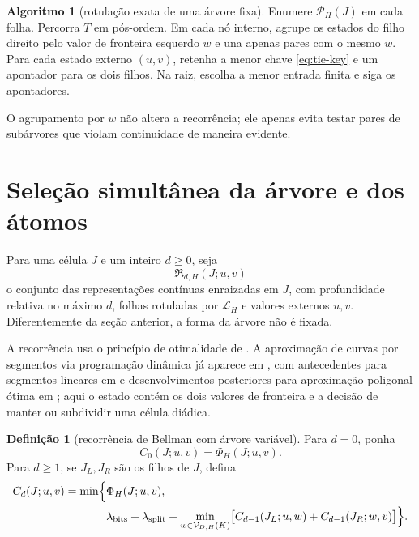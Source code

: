 \documentclass[11pt,a4paper]{article}
\theoremstyle{definition}
\newtheorem{definition}[theorem]{Definição}
\newtheorem{algorithm}[theorem]{Algoritmo}
\theoremstyle{remark}
\newcommand{\Library}{\mathcal{L}}
\newcommand{\Representations}{\mathfrak{R}}
\newcommand{\Values}{\mathcal{V}}
\newcommand{\Pairs}{\mathcal{P}}
\begin{document}
\begin{algorithm}[rotulação exata de uma árvore fixa]
\label{alg:fixed-tree}
Enumere $\Pairs_H(J)$ em cada folha. Percorra $T$ em pós-ordem. Em cada nó
interno, agrupe os estados do filho direito pelo valor de fronteira esquerdo
$w$ e una apenas pares com o mesmo $w$. Para cada estado externo $(u,v)$,
retenha a menor chave \eqref{eq:tie-key} e um apontador para os dois filhos.
Na raiz, escolha a menor entrada finita e siga os apontadores.
\end{algorithm}

O agrupamento por $w$ não altera a recorrência; ele apenas evita testar pares
de subárvores que violam continuidade de maneira evidente.

\section{Seleção simultânea da árvore e dos átomos}
\label{sec:variable-dp}

Para uma célula $J$ e um inteiro $d\ge0$, seja
\[
 \Representations_{d,H}(J;u,v)
\]
o conjunto das representações contínuas enraizadas em $J$, com profundidade
relativa no máximo $d$, folhas rotuladas por $\Library_H$ e valores externos
$u,v$. Diferentemente da seção anterior, a forma da árvore não é fixada.

A recorrência usa o princípio de otimalidade de \citet{bellman1957}. A
aproximação de curvas por segmentos via programação dinâmica já aparece em
\citet{bellman1961}, com antecedentes para segmentos lineares em
\citet{stone1961} e desenvolvimentos posteriores para aproximação poligonal
ótima em \citet{perezvidal1994}; aqui o estado contém os dois valores de
fronteira e a decisão de manter ou subdividir uma célula diádica.

\begin{definition}[recorrência de Bellman com árvore variável]
\label{def:variable-recurrence}
Para $d=0$, ponha
\begin{equation}
 C_0(J;u,v)=\Phi_H(J;u,v).
 \label{eq:variable-base}
\end{equation}
Para $d\ge1$, se $J_L,J_R$ são os filhos de $J$, defina
\begin{align}
 C_d(J;u,v)
 =\min\Bigl\{&
 \Phi_H(J;u,v),\notag\\
 &\lambda_{\rm bits}+\lambda_{\rm split}
 +\min_{w\in\Values_{D,H}(K)}
 \bigl[C_{d-1}(J_L;u,w)+C_{d-1}(J_R;w,v)\bigr]
 \Bigr\}.
 \label{eq:variable-recurrence}
\end{align}
\end{definition}
\end{document}
